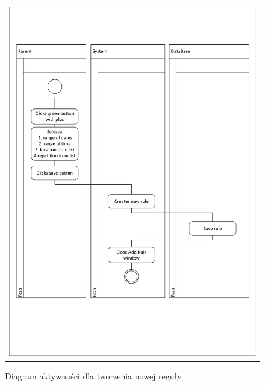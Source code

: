 \documentclass{sprawozdanie-agh}
\begin{document}
			\begin{figure}[H]
				\centering
				\begin{tabular}{c}
					\includegraphics[width=.95\textwidth]{crudCreate} 
				\end{tabular}
			\caption{Diagram aktywności dla tworzenia nowej reguły}
			\end{figure}
\end{document}
